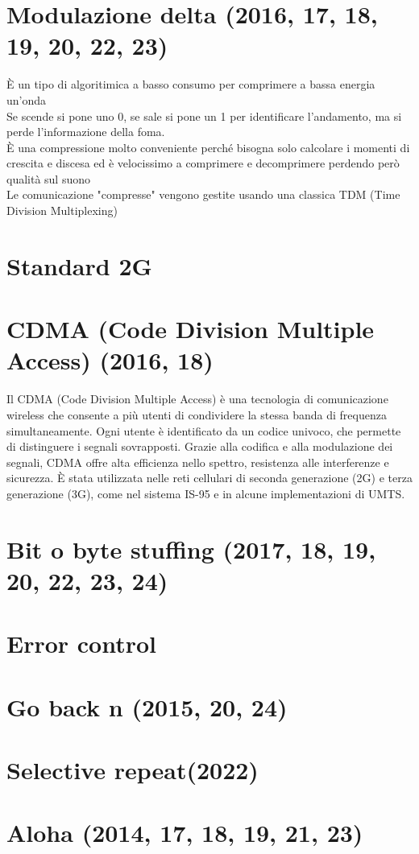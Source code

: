 \documentclass[12pt,oneside,a4paper]{article}
\begin{document}
\section{Modulazione delta (2016, 17, 18, 19, 20, 22, 23)}
È un tipo di algoritimica a basso consumo per comprimere a bassa energia un'onda\\
Se scende si pone uno 0, se sale si pone un 1 per identificare l'andamento, ma si perde l'informazione della foma.\\
È una compressione molto conveniente perché bisogna solo calcolare i momenti di crescita e discesa ed è velocissimo a comprimere e decomprimere perdendo però qualità sul suono\\
Le comunicazione "compresse" vengono gestite usando una classica TDM (Time Division Multiplexing)
\section{Standard 2G}
\section{CDMA (Code Division Multiple Access) (2016, 18)}
Il CDMA (Code Division Multiple Access) è una tecnologia di comunicazione wireless che consente a più utenti di condividere la stessa banda di frequenza simultaneamente. Ogni utente è identificato da un codice univoco, che permette di distinguere i segnali sovrapposti. Grazie alla codifica e alla modulazione dei segnali, CDMA offre alta efficienza nello spettro, resistenza alle interferenze e sicurezza. È stata utilizzata nelle reti cellulari di seconda generazione (2G) e terza generazione (3G), come nel sistema IS-95 e in alcune implementazioni di UMTS.
\section{Bit o byte stuffing (2017, 18, 19, 20, 22, 23, 24)}
\section{Error control}
\section{Go back n (2015, 20, 24)}
\section{Selective repeat(2022)}
\section{Aloha (2014, 17, 18, 19, 21, 23)}
\end{document}
